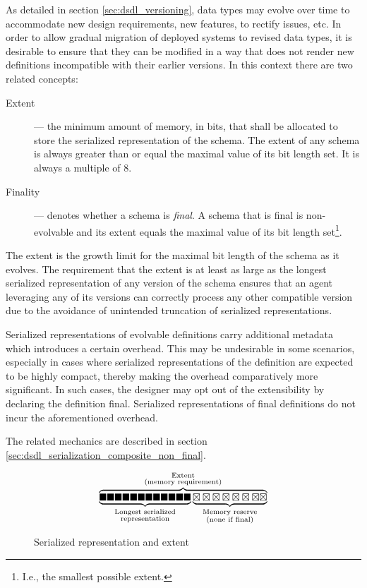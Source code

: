As detailed in section \ref{sec:dsdl_versioning},
data types may evolve over time to accommodate new design requirements, new features, to rectify issues, etc.
In order to allow gradual migration of deployed systems to revised data types,
it is desirable to ensure that they can be modified in a way that does not render new definitions
incompatible with their earlier versions.
In this context there are two related concepts:

\begin{description}
    \item[Extent] --- the minimum amount of memory, in bits, that shall be allocated to store the serialized
    representation of the schema.
    The extent of any schema is always greater than or equal the maximal value of its bit length set.
    It is always a multiple of 8.

    \item[Finality] --- denotes whether a schema is \emph{final}.
    A schema that is final is non-evolvable and its extent equals the maximal value of its bit length set\footnote{%
        I.e., the smallest possible extent.
    }.
\end{description}

The extent is the growth limit for the maximal bit length of the schema as it evolves.
The requirement that the extent is at least as large as the longest serialized representation of
any version of the schema ensures that an agent leveraging any of its versions can
correctly process any other compatible version due to the avoidance of unintended truncation of
serialized representations.

Serialized representations of evolvable definitions carry additional metadata which introduces a certain overhead.
This may be undesirable in some scenarios, especially in cases where serialized representations of the
definition are expected to be highly compact, thereby making the overhead comparatively more significant.
In such cases, the designer may opt out of the extensibility by declaring the definition final.
Serialized representations of final definitions do not incur the aforementioned overhead.

The related mechanics are described in section \ref{sec:dsdl_serialization_composite_non_final}.

\begin{figure}[H]
    $$
    \overbrace{%
        \underbrace{%
            \blacksquare\blacksquare\blacksquare\blacksquare\blacksquare\blacksquare%
            \blacksquare\blacksquare\blacksquare\blacksquare\blacksquare\blacksquare%
        }_{\substack{\text{Longest serialized} \\ \text{representation}}}%
        \underbrace{%
            \boxtimes\boxtimes\boxtimes\boxtimes\boxtimes\boxtimes\boxtimes\boxtimes%
        }_{\substack{\text{Memory reserve} \\ \text{(none if final)}}}%
    }^{\substack{%
        \text{Extent} \\
        \text{(memory requirement)}
    }}
    $$
    \caption{Serialized representation and extent\label{fig:dsdl_extent}}
\end{figure}

